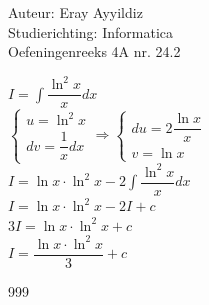 \documentclass[a4paper]{article}
\begin{document}
\noindent \large Auteur: Eray Ayyildiz \\
\noindent \large Studierichting:  Informatica\\
\noindent \large Oefeningenreeks 4A nr. 24.2\\

\medskip

\normalsize


$I = \displaystyle\int \dfrac{\ln^2 x}{x} dx $\\

$\left\{
    \begin{array}{l}
        u = \ln^2 x \\
        dv = \dfrac{1}{x}  dx
    \end{array}
\right .
\Rightarrow
\left\{
    \begin{array}{l}
        du = 2 \dfrac{\ln x}{x} \\
        v = \ln x
      
    \end{array}
\right .$\\

$I = \ln x \cdot \ln^2 x - 2 \displaystyle\int \dfrac{\ln^2 x}{x} dx $\\

$I = \ln x \cdot \ln^2 x - 2 I + c$\\

$3I = \ln x \cdot \ln^2 x + c $\\

$I = \dfrac{\ln x \cdot \ln^2 x}{3} + c $\\


\begin{thebibliography}{999}
\end{thebibliography}
\end{document}
